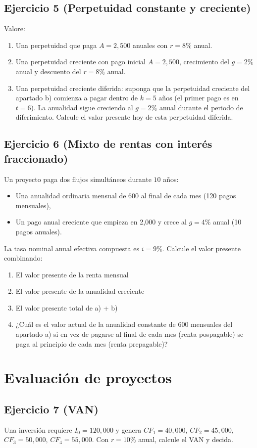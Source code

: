 \documentclass[12pt,a4paper]{article}
\newenvironment{ejercicio}[1]{\subsection*{Ejercicio #1}}{}
\begin{document}
\begin{ejercicio}{5 (Perpetuidad constante y creciente)}
Valore:
\begin{enumerate}[label=\alph*)]
  \item Una perpetuidad que paga $A=2{,}500$ anuales con $r=8\%$ anual.
  \item Una perpetuidad creciente con pago inicial $A=2{,}500$, crecimiento del $g=2\%$ anual y descuento del $r=8\%$ anual.
  \item Una perpetuidad creciente diferida: suponga que la perpetuidad creciente del apartado b) comienza a pagar dentro de $k=5$ años (el primer pago es en $t=6$). La anualidad sigue creciendo al $g=2\%$ anual durante el periodo de diferimiento. Calcule el valor presente hoy de esta perpetuidad diferida.
\end{enumerate}
\end{ejercicio}

\begin{ejercicio}{6 (Mixto de rentas con interés fraccionado)}
Un proyecto paga dos flujos simultáneos durante $10$ años:
\begin{itemize}
  \item Una anualidad ordinaria mensual de 600 al final de cada mes (120 pagos mensuales),
  \item Un pago anual creciente que empieza en 2{,}000 y crece al $g=4\%$ anual (10 pagos anuales).
\end{itemize}
La tasa nominal anual efectiva compuesta es $i=9\%$. Calcule el valor presente combinando:
\begin{enumerate}[label=\alph*)]
  \item El valor presente de la renta mensual
  \item El valor presente de la anualidad creciente
  \item El valor presente total de a) + b)
  \item ¿Cuál es el valor actual de la anualidad constante de 600 mensuales del apartado a) si en vez de pagarse al final de cada mes (renta pospagable) se paga al principio de cada mes (renta prepagable)?
\end{enumerate}
\end{ejercicio}

\section{Evaluación de proyectos}

\begin{ejercicio}{7 (VAN)}
Una inversión requiere $I_0=120{,}000$ y genera $CF_1=40{,}000$, $CF_2=45{,}000$, $CF_3=50{,}000$, $CF_4=55{,}000$. Con $r=10\%$ anual, calcule el VAN y decida.
\end{ejercicio}
\end{document}
